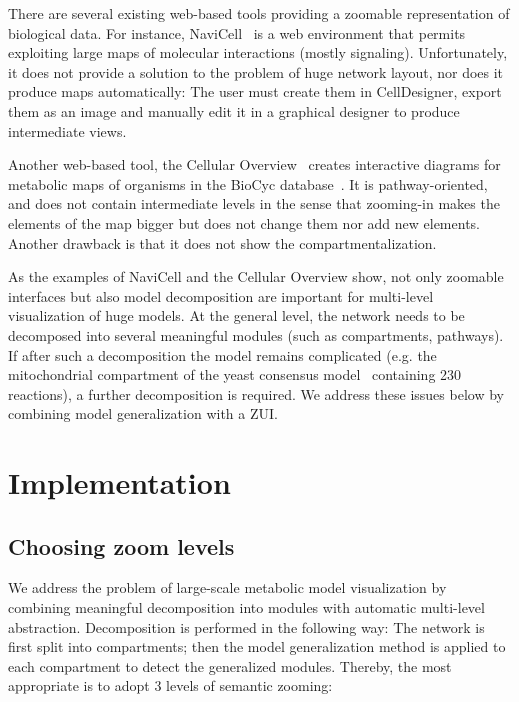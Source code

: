 \documentclass{bmcart}
\begin{document}
There are several existing web-based tools providing a zoomable representation of biological data. For instance, NaviCell~\cite{Kuperstein2013} is a web environment that permits exploiting large maps of molecular interactions (mostly signaling). Unfortunately, it does not provide a solution to the problem of huge network layout, nor does it produce  maps automatically: The user must create them in CellDesigner, export them as an image and manually edit it in a graphical designer to produce intermediate views.

Another web-based tool, the Cellular Overview~\cite{Latendresse2011} creates interactive diagrams for metabolic maps of organisms in the BioCyc database~\cite{Caspi2012}. It is pathway-oriented, and does not contain intermediate levels in the sense that zooming-in makes the elements of the map bigger but does not change them nor add new elements. Another drawback is that it does not show the compartmentalization.

As the examples of NaviCell and the Cellular Overview show, not only zoomable interfaces but also model decomposition are important for multi-level visualization of huge models. At the general level, the network needs to be decomposed into several meaningful modules (such as compartments, pathways). If after such a decomposition the model remains complicated (e.g. the mitochondrial compartment of the yeast consensus model~\cite{Herrgard2008} containing 230 reactions), a further decomposition is required. We address these issues below by combining model generalization with a ZUI.


\section*{Implementation}

\subsection*{Choosing zoom levels}
We address the problem of large-scale metabolic model visualization by combining meaningful decomposition into modules with automatic multi-level abstraction. Decomposition is performed in the following way: The network is first split into compartments; then the model generalization method is applied to each compartment to detect the generalized modules. Thereby, the most appropriate is to adopt 3 levels of semantic zooming:
\end{document}
